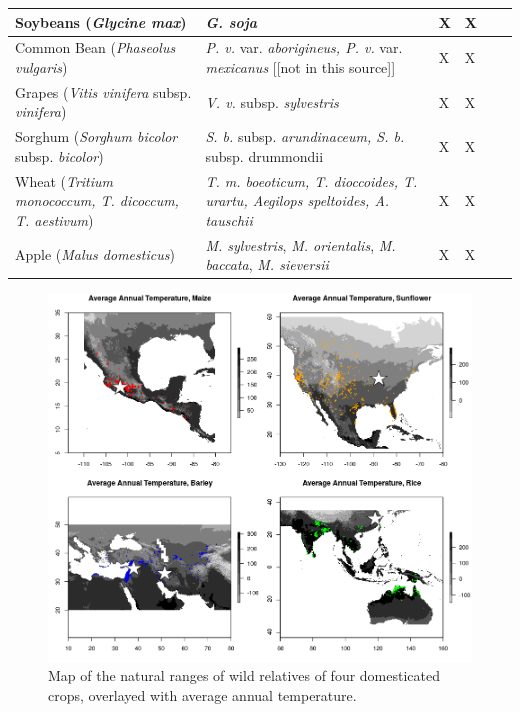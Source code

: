 \documentclass[11pt]{article}
\begin{document}
\begin{table}
\begin{adjustbox}{width=1\textwidth}
\begin{tabular}{|p{5cm}|p{5cm}|p{2.6cm}|p{2.6cm}|p{2.6cm}|l|}
\hline
Soybeans (\emph{Glycine max}) & \emph{G. soja} & X & X &  & \cite{lam2010resequencing} \\ 
\hline
Common Bean (\emph{Phaseolus vulgaris}) & \emph{P. v.} var. \emph{aborigineus, P. v.} var. \emph{mexicanus} [[not in this source]]& X & X &  & \cite{papa2003asymmetry} \\
\hline
Grapes (\emph{Vitis vinifera} subsp. \emph{vinifera}) & \emph{V. v.} subsp. \emph{sylvestris} & X & X &  &  \cite{myles2011genetic} \\
\hline
Sorghum (\emph{Sorghum bicolor} subsp. \emph{bicolor}) & \emph{S. b.} subsp. \emph{arundinaceum, S. b.} subsp. {drummondii} & X & X &  & \cite{aldrich1992patterns} \\
\hline
Wheat (\emph{Tritium monococcum, T. dicoccum, T. aestivum}) & \emph{T. m. boeoticum, T. dioccoides, T. urartu, Aegilops speltoides, A. tauschii} & X & X &  & \cite{zohary1969wild} \\
\hline
Apple (\emph{Malus domesticus}) & \emph{M. sylvestris}, \emph{M. orientalis}, \emph{M. baccata}, \emph{M. sieversii}  & X & X & & \cite{cornille2012new} \\
\hline
\end{tabular}
\end{adjustbox}
\end{table}

\begin{figure}[h]
	\centering
	\includegraphics[width=17.35cm]{par_figure_stars.png}
	\caption{Map of the natural ranges of wild relatives of four domesticated crops, overlayed with average annual temperature.}
	\label{boxplot:map}
\end{figure}
\end{document}
